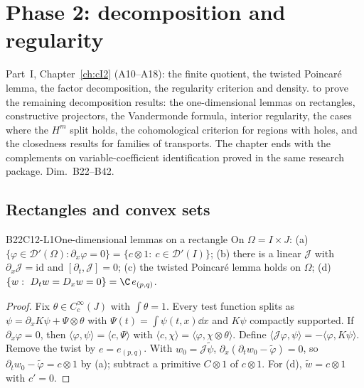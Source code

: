 \chapter{Phase 2: decomposition and regularity}\label{ch:cII2}
\chapterbrief
{Part~I, Chapter~\ref{ch:cI2} (A10--A18): the finite quotient, the twisted Poincar\'e lemma, the factor decomposition, the regularity criterion and density.}
{to prove the remaining decomposition results: the one-dimensional lemmas on rectangles, constructive projectors, the Vandermonde formula, interior regularity, the cases where the $H^m$ split holds, the cohomological criterion for regions with holes, and the closedness results for families of transports. The chapter ends with the complements on variable-coefficient identification proved in the same research package.}
{Dim.~B22--B42.}

\section{Rectangles and convex sets}

\begin{dimcard}{B22}{C12-L1}{One-dimensional lemmas on a rectangle}{\proved}{}
On $\Omega=I\times J$: (a) $\{\varphi\in\mathcal D'(\Omega):\partial_x\varphi=0\}=\{c\otimes1:\ c\in\mathcal D'(I)\}$; (b) there is a linear $\mathcal J$ with $\partial_x\mathcal J=\mathrm{id}$ and $[\partial_t,\mathcal J]=0$; (c) the twisted Poincar\'e lemma holds on $\Omega$; (d) $\{w:\ D_tw=D_xw=0\}=\C\,e_{(p,q)}$.
\end{dimcard}
\begin{proof}
Fix $\theta\in C_c^\infty(J)$ with $\int\theta=1$. Every test function splits as $\psi=\partial_xK\psi+\Psi\otimes\theta$ with $\Psi(t)=\int\psi(t,x)\dd x$ and $K\psi$ compactly supported. If $\partial_x\varphi=0$, then $\langle\varphi,\psi\rangle=\langle c,\Psi\rangle$ with $\langle c,\chi\rangle=\langle\varphi,\chi\otimes\theta\rangle$. Define $\langle\mathcal J\varphi,\psi\rangle=-\langle\varphi,K\psi\rangle$.
Remove the twist by $e=e_{(p,q)}$. With $w_0=\mathcal J\tilde\psi$, $\partial_x(\partial_tw_0-\tilde\varphi)=0$, so $\partial_tw_0-\tilde\varphi=c\otimes1$ by (a); subtract a primitive $C\otimes1$ of $c\otimes1$. For (d), $\tilde w=c\otimes1$ with $c'=0$.
\end{proof}

